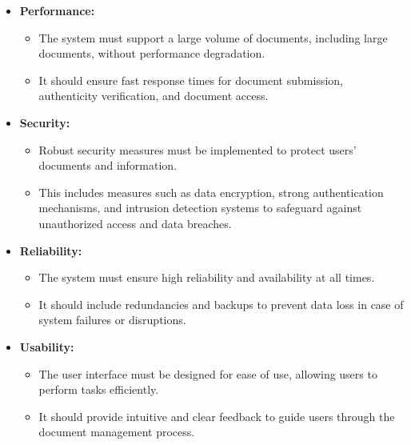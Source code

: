 \documentclass[a4paper,11pt]{article}
\begin{document}
                \begin{itemize}
                    \item \textbf{Performance:} 
                    \begin{itemize}
                        \item The system must support a large volume of documents, including large documents, without performance degradation.
                        \item It should ensure fast response times for document submission, authenticity verification, and document access.
                    \end{itemize}
                    
                    \item \textbf{Security:} 
                    \begin{itemize}
                        \item Robust security measures must be implemented to protect users' documents and information. 
                        \item This includes measures such as data encryption, strong authentication mechanisms, and intrusion detection systems to safeguard against unauthorized access and data breaches.
                    \end{itemize}
                    
                    \item \textbf{Reliability:} 
                    \begin{itemize}
                        \item The system must ensure high reliability and availability at all times. 
                        \item It should include redundancies and backups to prevent data loss in case of system failures or disruptions.
                    \end{itemize}
                    
                    \item \textbf{Usability:} 
                    \begin{itemize}
                        \item The user interface must be designed for ease of use, allowing users to perform tasks efficiently. 
                        \item It should provide intuitive and clear feedback to guide users through the document management process.
                    \end{itemize}
                    

\end{itemize}
\end{document}
